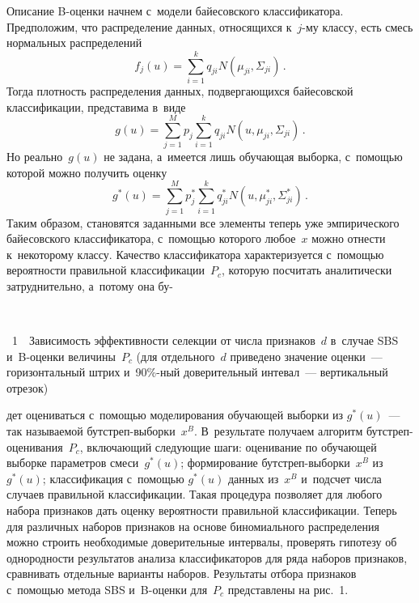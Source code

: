 \begin{multicols}{2}
     Описание B-оценки начнем с~модели байесовского классификатора. 
Предположим, что распределение данных, относящихся к~$j$-му классу, есть 
смесь нормальных распределений 
$$
f_j(u)= \sum\limits_{i=1}^k  q_{ji}N\left(\mu_{ji},\Sigma_{ji}\right)\,.
$$
 Тогда плотность распределения данных, 
подвергающихся байесовской классификации, представима в~виде 
$$
g(u)=  \sum\limits_{j=1}^M p_j \sum\limits_{i=1}^k q_{ji} 
N\left(u,\mu_{ji},\Sigma_{ji}\right)\,.
$$
Но 
реально~$g(u)$ не задана, а~имеется лишь обучающая выборка, с~помощью 
которой можно получить оценку 
$$
g^*(u)= \sum\limits_{j=1}^M p_j^* \sum\limits_{i=1}^k 
q^*_{ji} N\left(u,\mu^*_{ji},\Sigma^*_{ji}\right)\,.
$$
 Таким образом, становятся заданными 
все элементы теперь уже эмпирического байесовского классификатора, 
с~помощью которого любое~$x$ можно отнести к~некоторому классу. Качество 
классификатора характеризуется с~помощью вероятности правильной 
классификации~$P_c$, которую посчитать  аналитически затруднительно, 
а~потому она бу-\linebreak
\vspace*{-12pt}

\columnbreak

 \noindent
 \begin{center}  %
 \vspace*{-6pt}
 \mbox{%
 \epsfxsize=77.995mm
 }
\end{center} 



\noindent
{{\figurename~1}\ \ \small{Зависимость эффективности селекции от чис\-ла признаков~$d$ в~случае SBS  
и~B-оцен\-ки величины~$P_c$ (для отдельного~$d$ приведено значение оценки~--- 
горизонтальный штрих и~90\%-ный доверительный интевал~--- вертикальный отрезок)}}



 \vspace*{9pt}
 


\noindent
дет оцениваться с~помощью моделирования обуча\-ющей 
выборки из $g^*(u)$~--- так называемой бут\-стреп-вы\-бор\-ки~$x^B$. 
В~результате получаем алгоритм бут\-стреп-оце\-ни\-ва\-ния~$P_c$, 
включающий следующие шаги: оценивание по обучающей выборке па\-ра\-мет\-ров 
смеси~$g^*(u)$; формирование бут\-стреп-вы\-бор\-ки~$x^B$ из~$g^*(u)$; 
классификация с~помощью $g^*(u)$ данных из~$x^B$ и~подсчет числа случаев 
правильной классификации. Такая процедура позволяет для любого набора 
признаков дать оценку вероятности правильной классификации. Теперь для 
различных наборов признаков на основе биномиального
 распределения можно 
строить необходимые доверительные интервалы, проверять гипотезу об 
однородности результатов анализа классификаторов для ряда наборов 
признаков, сравнивать отдельные варианты наборов. Результаты отбора 
признаков с~помощью метода SBS и~B-оцен\-ки для~$P_c$ пред\-став\-ле\-ны на 
рис.~1.



\end{multicols}
